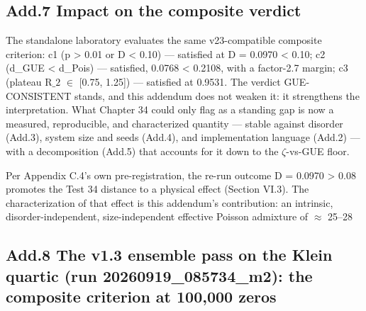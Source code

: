 \documentclass[10pt]{article}
\begin{document}
\subsection{Add.7 Impact on the composite verdict}


The standalone laboratory evaluates the same v23-compatible composite criterion: c1 (p > 0.01 or D < 0.10) --- satisfied at D = 0.0970 < 0.10; c2 (d\_GUE < d\_Pois) --- satisfied, 0.0768 < 0.2108, with a factor-2.7 margin; c3 (plateau R$\_2$ $\in$ [0.75, 1.25]) --- satisfied at 0.9531. The verdict GUE-CONSISTENT stands, and this addendum does not weaken it: it strengthens the interpretation. What Chapter 34 could only flag as a standing gap is now a measured, reproducible, and characterized quantity --- stable against disorder (Add.3), system size and seeds (Add.4), and implementation language (Add.2) --- with a decomposition (Add.5) that accounts for it down to the $\zeta$-vs-GUE floor.


Per Appendix C.4's own pre-registration, the re-run outcome D = 0.0970 > 0.08 promotes the Test 34 distance to a physical effect (Section VI.3). The characterization of that effect is this addendum's contribution: an intrinsic, disorder-independent, size-independent effective Poisson admixture of $\approx$ 25--28%

\subsection{Add.8 The v1.3 ensemble pass on the Klein quartic (run 20260919\_085734\_m2): the composite criterion at 100,000 zeros}
\end{document}
